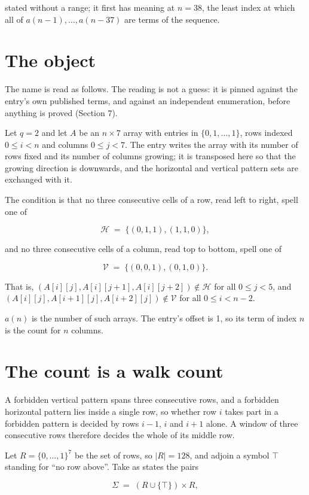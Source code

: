 \documentclass[11pt]{article}
\theoremstyle{definition}
\begin{document}
stated without a range; it first has meaning at $n = 38$, the least index at which all of $a(n-1),\dots,a(n-37)$ are terms of the sequence.

\section{The object}

The name is read as follows. The reading is not a guess: it is pinned against the entry's own published terms, and against an independent enumeration, before anything is proved (Section 7).

Let $q = 2$ and let $A$ be an $n \times 7$ array with entries in $\{0,1,\dots,1\}$, rows indexed $0 \le i < n$ and columns $0 \le j < 7$. The entry writes the array with its number of rows fixed and its number of columns growing; it is transposed here so that the growing direction is downwards, and the horizontal and vertical pattern sets are exchanged with it.

The condition is that no three consecutive cells of a row, read left to right, spell one of

\[\mathcal{H} \;=\; \{(0,1,1), (1,1,0)\},\]

and no three consecutive cells of a column, read top to bottom, spell one of

\[\mathcal{V} \;=\; \{(0,0,1), (0,1,0)\}.\]

That is, $(A[i][j],A[i][j{+}1],A[i][j{+}2]) \notin \mathcal{H}$ for all $0 \le j < 5$, and $(A[i][j],A[i{+}1][j],A[i{+}2][j]) \notin \mathcal{V}$ for all $0 \le i < n-2$.

$a(n)$ is the number of such arrays. The entry's offset is 1, so its term of index $n$ is the count for $n$ columns.

\section{The count is a walk count}

A forbidden vertical pattern spans three consecutive rows, and a forbidden horizontal pattern lies inside a single row, so whether row $i$ takes part in a forbidden pattern is decided by rows $i-1$, $i$ and $i+1$ alone. A window of three consecutive rows therefore decides the whole of its middle row.

Let $R = \{0,\dots,1\}^{7}$ be the set of rows, so $|R| = 128$, and adjoin a symbol $\top$ standing for ``no row above''. Take as states the pairs

\[\Sigma \;=\; (R \cup \{\top\}) \times R,\]
\end{document}
